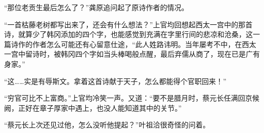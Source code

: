 “那位老贡生最后怎么了？”龚原追问起了原诗作者的情况。

“一首枯藤老树都写出来了，还会有什么想法？”上官均回想起西太一宫中的那首诗，就算少了韩冈添加的四个字，也能感觉到充满在字里行间的悲凉和沧桑，这一篇诗作的作者怎么可能还有心留意仕途，“此人姓路讳明。当年屡考不中，在西太一宫中留诗时，被韩冈四个字如当头棒喝般点醒，最后弃儒从商了，现在已是广有身家。”

“这……实是有辱斯文。拿着这首诗献于天子，怎么都能得个官职回来！”

“穷官可比不上富商。”上官均冷笑一声。又道：“要不是腊月时，蔡元长任满回京候阙，正好在章子厚家中遇上，也没人能知道其中的关节。”

“蔡元长上次还见过他，怎么没听他提起？”叶祖洽很奇怪的问着。

